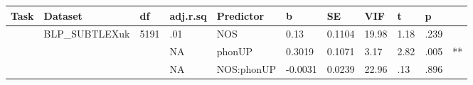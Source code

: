 \begin{table}[ht]
\centering
\begingroup\normalsize
\begin{tabular}{lllllllllll}
  \hline
Task & Dataset & df & adj.r.sq & Predictor & b & SE & VIF & t & p &  \\ 
  \hline
 & BLP\_SUBTLEXuk & 5191 & .01 & NOS & 0.13 & 0.1104 & 19.98 & 1.18 & .239 &   \\ 
   &  &  & NA & phonUP & 0.3019 & 0.1071 & 3.17 & 2.82 & .005 & ** \\ 
   &  &  & NA & NOS:phonUP & -0.0031 & 0.0239 & 22.96 & .13 & .896 &   \\ 
   \hline
\end{tabular}
\endgroup
\end{table}
